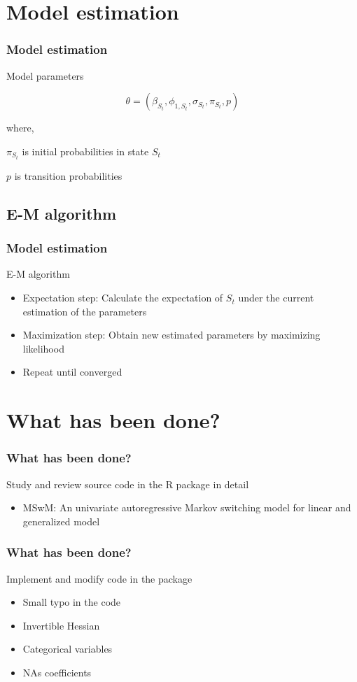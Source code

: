 \documentclass{beamer}
\begin{document}
\section{Model estimation}
\begin{frame}
\frametitle{Model estimation}
Model parameters

$$\theta = (\beta_{S_{t}}, \phi_{1,S_{t}},\sigma_{S_{t}}, \pi_{S_{t}}, p)$$

where,

$\pi_{S_{t}}$ is initial probabilities in state $S_{t}$

$p$ is transition probabilities

\end{frame}

\subsection{E-M algorithm}
\begin{frame}
\frametitle{Model estimation}	
E-M algorithm 
\begin{itemize}
	\item Expectation step: Calculate the expectation of $S_{t}$ under the current estimation of the parameters
	\item Maximization step: Obtain new estimated parameters by maximizing likelihood
	\item Repeat until converged
\end{itemize}

\end{frame}

\section{What has been done?}
\begin{frame}
\frametitle{What has been done?}
Study and review source code  in the R package in detail
\begin{itemize}
	\item MSwM: An univariate autoregressive Markov switching model for linear and generalized model
\end{itemize}
\end{frame}

\begin{frame}
\frametitle{What has been done?}
Implement and modify code in the package
\begin{itemize}
	\item Small typo in the code
	\item Invertible Hessian \cite{p2}
	\item Categorical variables
	\item NAs coefficients
\end{itemize}


\end{frame}
\end{document}
